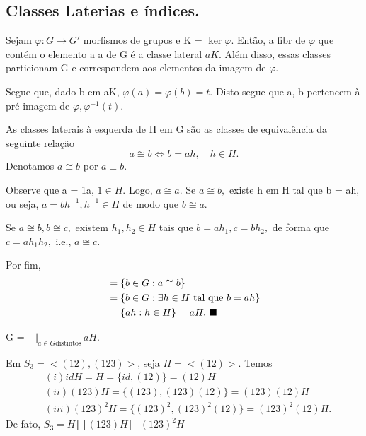 \documentclass[Algebra/algebra_notes.tex]{subfiles}
\begin{document}
\subsection{Classes Laterias e índices.}
\begin{prop*}
	Sejam $\varphi:G\rightarrow G'$ morfismos de grupos e K = $\ker{\varphi}$. Então, a fibr de $\varphi$ que contém o elemento a
	a de G é a classe lateral $aK$. Além disso, essas classes particionam G e correspondem aos elementos da imagem de $\varphi.$
\end{prop*}
\begin{proof*}
	Segue que, dado b em aK, $\varphi(a) = \varphi(b) = t$. Disto segue que a, b pertencem \`a pré-imagem de $\varphi, \varphi^{-1}(t).$
\end{proof*}
\begin{prop*}
	As classes laterais \`a esquerda de H em G são as classes de equivalência da seguinte relação
	$$
		a\cong{b} \Longleftrightarrow b = ah, \quad h\in H.
	$$
	Denotamos $a\cong{b}$ por $a\equiv b.$
\end{prop*}
\begin{proof*}
	Observe que a = 1a, $1\in H.$ Logo, $a\cong{a}.$ Se $a\cong{b},$ existe h em H tal que b = ah, ou seja, $a = bh^{-1}, h^{-1}\in H$
	de modo que $b\cong{a}.$

	Se $a\cong{b}, b\cong{c},$ existem $h_{1}, h_{2}\in H$ tais que $b = ah_{1}, c = bh_{2},$ de forma que $c = ah_{1}h_{2},$ i.e.,
	$a\cong{c}.$

	Por fim,
	\begin{align*}
		[a] & = \{b\in G: a\cong{b}\}                            \\
		    & = \{b\in G: \exists h\in H\text{ tal que }b = ah\} \\
		    & = \{ah: h \in H\} = aH.\text{ \qedsymbol}
	\end{align*}
\end{proof*}
\begin{crl*}
	G = $\bigsqcup_{a\in G\text{distintos}}^{}{aH}.$
\end{crl*}
\begin{example*}
	Em $S_{3} = <(12), (123)>$, seja $H = <(12)>.$ Temos
	\begin{align*}
		 & (i)id H = H = \{id, (12)\} = (12)H                               \\
		 & (ii)(123)H = \{(123), (123)(12)\} = (123)(12)H                   \\
		 & (iii)(123)^{2}H = \{(123)^{2}, (123)^{2}(12)\} = (123)^{2}(12)H.
	\end{align*}
	De fato, $S_{3} = H\bigsqcup_{}^{}{(123)H}\bigsqcup_{}^{}{(123)^{2}H}$ \qedsymbol
\end{example*}
\end{document}
